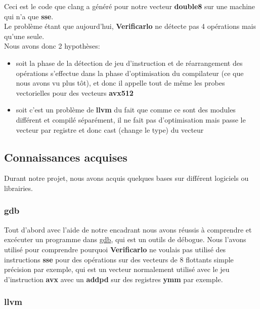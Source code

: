 \documentclass[11pt]{article}
\begin{document}
Ceci est le code que clang a généré pour notre vecteur \textbf{double8} sur une
machine qui n'a que \textbf{sse}.
\\ \vspace{5mm}
Le problème étant que aujourd'hui, \textbf{Verificarlo} ne détecte pas 4 opérations
mais qu'une seule.
\\ \vspace{5mm}
Nous avons donc 2 hypothèses:
\begin{itemize}
\item soit la phase de la détection de jeu d'instruction et de réarrangement des
opérations s'effectue dans la phase d'optimisation du compilateur (ce que
nous avons vu plus tôt), et donc il appelle tout de même les probes
vectorielles pour des vecteurs \textbf{avx512}
\item soit c'est un problème de \textbf{llvm} du fait que comme ce sont des modules
différent et compilé séparément, il ne fait pas d'optimisation mais passe
le vecteur par registre et donc cast (change le type) du vecteur
\end{itemize}

\subsection{Connaissances acquises}
\label{sec:org6123cba}

Durant notre projet, nous avons acquis quelques bases sur différent logiciels
ou librairies.

\subsubsection{gdb}
\label{sec:orgb877905}

Tout d'abord avec l'aide de notre encadrant nous avons réussis à comprendre
et excécuter un programme dans \href{https://www.gnu.org/software/gdb/}{gdb}, qui est un outils de débogue. Nous
l'avons utilisé pour comprendre pourquoi \textbf{Verificarlo} ne voulais pas utilisé
des instructions \textbf{sse} pour des opérations sur des vecteurs de 8 flottants
simple précision par exemple, qui est un vecteur normalement utilisé avec le
jeu d'instruction \textbf{avx} avec un \textbf{addpd} sur des registres \textbf{ymm} par exemple.

\subsubsection{llvm}
\label{sec:org475f20d}
\end{document}
